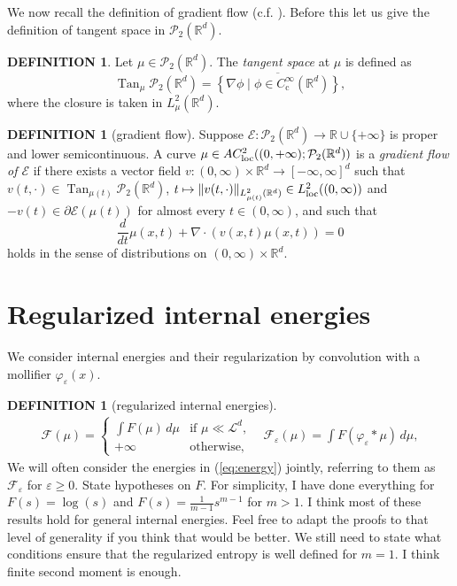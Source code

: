 \documentclass[11pt,leqno]{amsart}
\theoremstyle{definition}
\newtheorem{defi}[thm]{DEFINITION}
\newcommand{\bes}{\begin{equation*}}
\newcommand{\ees}{\end{equation*}}
\newcommand{\R}{{\mathord{\mathbb R}}}
\newcommand{\Rd}{{\mathord{\mathbb R}^d}}
\newcommand{\loc}{{\rm loc}}
\newcommand{\grad}{\nabla}
\newcommand{\F}{\mathcal{F}}
\def\P{{\mathcal P}}
\def\e{\varepsilon}
\newcommand{\E}{\mathcal{E}}
\def\F{\mathcal{F}}
\DeclareMathOperator{\Tan}{Tan}
\begin{document}
We now recall the definition of gradient flow (c.f. \cite[Proposition 8.3.1, Definition 11.1.1]{AGS}). Before this let us give the definition of tangent space in $\P_2(\R^d)$.
\begin{defi}
	Let $\mu \in \P_2(\R^d)$. The \emph{tangent space} at $\mu$ is defined as
\bes
	\Tan_\mu \P_2(\R^d) = \overline{\left\{ \grad\phi \mid \phi \in C_\mathrm{c}^\infty(\R^d) \right\}},
\ees
where the closure is taken in $L^2_\mu(\R^d)$.
\end{defi}

\begin{defi}[gradient flow] \label{gradientflowdef}
	Suppose $\E\colon \P_2(\Rd) \to \R \cup \{+\infty\}$ is proper and lower semicontinuous. A curve $\mu \in AC^2_\loc((0,+\infty); \P_2(\Rd))$ is a \emph{gradient flow of $\E$} if there exists a vector field $v\colon (0,\infty)\times \R^d \to [-\infty,\infty]^d$ such that $v(t,\cdot)\in\Tan_{\mu(t)}\P_2(\R^d)$, $t\mapsto \|v(t,\cdot)\|_{L^2_{\mu(t)}(\R^d)} \in L^2_\loc((0,\infty))$ and $- v(t) \in \partial \E(\mu(t))$ for almost every $t\in(0,\infty)$, and such that 
\[ 
	\frac{d}{dt} \mu(x,t) + \grad \cdot (v(x,t) \mu(x,t)) = 0 
\]
holds in the sense of distributions on $(0,\infty)\times\R^d$.
\end{defi}

\section{Regularized internal energies}
We consider internal energies and their regularization by convolution with a mollifier $\varphi_\e(x)$.
\begin{defi}[regularized internal energies] \label{energy def}
\begin{align}
 \label{eq:energy}
	\F(\mu) = \begin{cases} \int F(\mu) \,d\mu & \mbox{if $\mu \ll \mathcal{L}^d$,} \\ +\infty & \mbox{otherwise,} \end{cases} \quad  \F_\e(\mu) =  \int F(\varphi_\e * \mu) \, d\mu ,
\end{align}
We will often consider the energies in (\ref{eq:energy}) jointly, referring to them as $\F_\e$ for $\e \geq 0$.	
{\color{Aquamarine} State hypotheses on $F$. For simplicity, I have done everything for $F(s) = \log(s)$ and $F(s) = \frac{1}{m-1} s^{m-1}$ for $m > 1$. I think most of these results hold for general internal energies. Feel free to adapt the proofs to that level of generality if you think that would be better. We still need to state what conditions ensure that the regularized entropy is well defined for $m=1$. I think finite second moment is enough.}
\end{defi}
\end{document}
